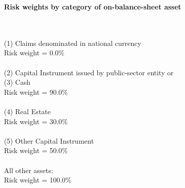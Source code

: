 \documentclass{article}
\begin{document}
\setlength{\parindent}{0em}
\begin{center}{\bf Risk weights by category of on-balance-sheet asset}\end{center}
~\\
~\\

(1) Claims denominated in national currency \\
Risk weight = 0.0\%\\

~\\
(2) Capital Instrument issued by public-sector entity or \\
(3) Cash \\
Risk weight = 90.0\%\\

~\\
(4) Real Estate\\
Risk weight = 30.0\%\\

~\\
(5) Other Capital Instrument\\
Risk weight = 50.0\%\\

~\\
All other assets:\\
Risk weight = 100.0\%\\

~\\
\end{document}

